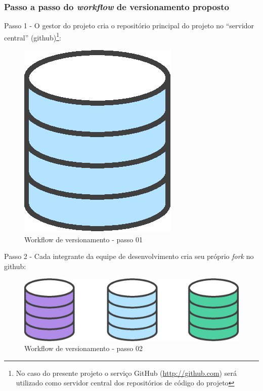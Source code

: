 \subsubsection{Passo a passo do \textit{workflow} de versionamento proposto}
Passo 1 - O gestor do projeto cria o repositório principal do projeto no ``servidor central'' (github)\footnote{No caso do presente projeto o serviço GitHub (\url{http://github.com}) será utilizado como servidor central dos repositórios de código do projeto}:
    \begin{figure}[htb]%
        \begin{center}
            \includegraphics[scale=0.2]{./imagens/forkflow.eps}%
        \end{center}%
        \caption{Workflow de versionamento - passo 01 \label{fig:forkflow01}}%
    \end{figure}%

Passo 2 - Cada integrante da equipe de desenvolvimento cria seu próprio \textit{fork} no github:
    \begin{figure}[htb]%
        \begin{center}
            \includegraphics[scale=0.2]{./imagens/forkflow2.eps}%
        \end{center}%
        \caption{Workflow de versionamento - passo 02 \label{fig:forkflow02}}%
    \end{figure}%
    
